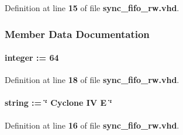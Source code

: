 Definition at line {\bf 15} of file {\bf sync\+\_\+fifo\+\_\+rw.\+vhd}.



\subsubsection{Member Data Documentation}
\paragraph[{data\+\_\+w}]{ {\bfseries \textcolor{vhdlchar}{ }} {\bfseries \textcolor{comment}{integer}\textcolor{vhdlchar}{ }\textcolor{vhdlchar}{ }\textcolor{vhdlchar}{\+:}\textcolor{vhdlchar}{=}\textcolor{vhdlchar}{ }\textcolor{vhdlchar}{ } \textcolor{vhdldigit}{64} \textcolor{vhdlchar}{ }} \hspace{0.3cm}{\ttfamily [Generic]}}\label{classsync__fifo__rw_abe368ea8e238620b0e57bbbdcf4fe2bf}


Definition at line {\bf 18} of file {\bf sync\+\_\+fifo\+\_\+rw.\+vhd}.

\paragraph[{dev\+\_\+family}]{ {\bfseries \textcolor{vhdlchar}{ }} {\bfseries \textcolor{comment}{string}\textcolor{vhdlchar}{ }\textcolor{vhdlchar}{ }\textcolor{vhdlchar}{\+:}\textcolor{vhdlchar}{=}\textcolor{vhdlchar}{ }\textcolor{vhdlchar}{ }\textcolor{vhdlchar}{ }\textcolor{vhdlchar}{ }\textcolor{keyword}{\char`\"{} Cyclone I\+V E \char`\"{}}\textcolor{vhdlchar}{ }} \hspace{0.3cm}{\ttfamily [Generic]}}\label{classsync__fifo__rw_a1314572919959082d23e5f98e64a0ce2}


Definition at line {\bf 16} of file {\bf sync\+\_\+fifo\+\_\+rw.\+vhd}.

\paragraph[{ieee}]{\hspace{0.3cm}{\ttfamily [Library]}}\label{classsync__fifo__rw_a0a6af6eef40212dbaf130d57ce711256}



